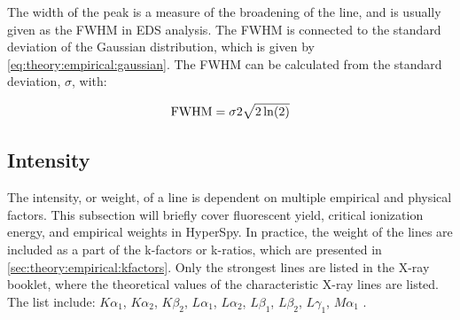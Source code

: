 The width of the peak is a measure of the broadening of the line, and is usually given as the FWHM in EDS analysis. The FWHM is connected to the standard deviation of the Gaussian distribution, which is given by \cref{eq:theory:empirical:gaussian}.
The FWHM can be calculated from the standard deviation, $\sigma$, with:

\begin{equation}
    \label{eq:theory:empirical:peaks:FWHM}
    \textnormal{FWHM} = {\sigma}{2\sqrt{2\ln(2)}}
\end{equation}


%
% 
\subsection{Intensity}
\label{sec:theory:empirical:intensity}



The intensity, or weight, of a line is dependent on multiple empirical and physical factors.
This subsection will briefly cover fluorescent yield, critical ionization energy, and empirical weights in HyperSpy.
In practice, the weight of the lines are included as a part of the k-factors or k-ratios, which are presented in \cref{sec:theory:empirical:kfactors}.
Only the strongest lines are listed in the X-ray booklet, where the theoretical values of the characteristic X-ray lines are listed.
The list include: $K\alpha_1$, $K\alpha_2$, $K\beta_2$, $L\alpha_1$, $L\alpha_2$, $L\beta_1$, $L\beta_2$, $L\gamma_1$, $M\alpha_1$ \cite{thompson_x-ray_2004}.

